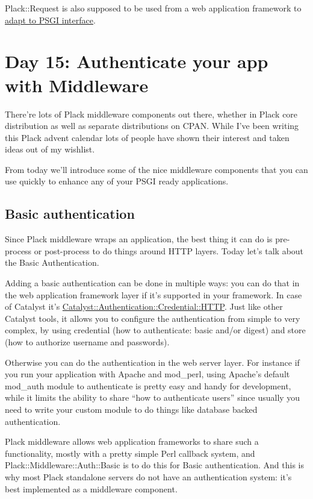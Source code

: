 Plack::Request is also supposed to be used from a web application
framework to
\href{http://advent.plackperl.org/2009/12/day-8-adapting-web-frameworks-to-psgi.html}{adapt
to PSGI interface}.

\chapter{Day 15: Authenticate your app with
Middleware}\label{day-15-authenticate-your-app-with-middleware}

There're lots of Plack middleware components out there, whether in Plack
core distribution as well as separate distributions on CPAN. While I've
been writing this Plack advent calendar lots of people have shown their
interest and taken ideas out of my wishlist.

From today we'll introduce some of the nice middleware components that
you can use quickly to enhance any of your PSGI ready applications.

\section{Basic authentication}\label{basic-authentication}

Since Plack middleware wraps an application, the best thing it can do is
pre-process or post-process to do things around HTTP layers. Today let's
talk about the Basic Authentication.

Adding a basic authentication can be done in multiple ways: you can do
that in the web application framework layer if it's supported in your
framework. In case of Catalyst it's
\href{http://search.cpan.org/perldoc?Catalyst::Authentication::Credential::HTTP}{Catalyst::Authentication::Credential::HTTP}.
Just like other Catalyst tools, it allows you to configure the
authentication from simple to very complex, by using credential (how to
authenticate: basic and/or digest) and store (how to authorize username
and passwords).

Otherwise you can do the authentication in the web server layer. For
instance if you run your application with Apache and mod\_perl, using
Apache's default mod\_auth module to authenticate is pretty easy and
handy for development, while it limits the ability to share ``how to
authenticate users'' since usually you need to write your custom module
to do things like database backed authentication.

Plack middleware allows web application frameworks to share such a
functionality, mostly with a pretty simple Perl callback system, and
Plack::Middleware::Auth::Basic is to do this for Basic authentication.
And this is why most Plack standalone servers do not have an
authentication system: it's best implemented as a middleware component.

